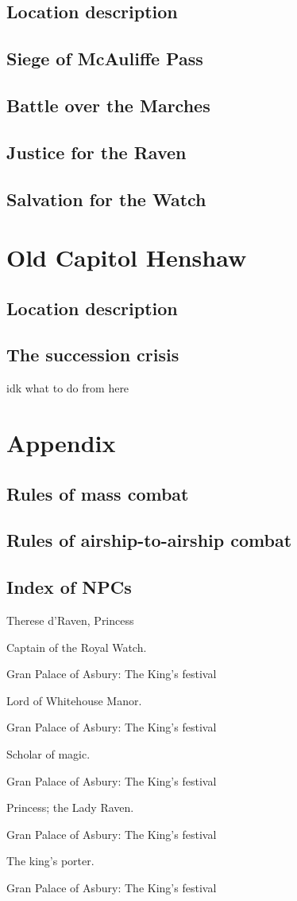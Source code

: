 \documentclass{report}
\theoremstyle{definition}
\begin{document}
\section{Location description}
\section{Siege of McAuliffe Pass}
\section{Battle over the Marches}
\section{Justice for the Raven}
\section{Salvation for the Watch}
\chapter{Old Capitol Henshaw}
\section{Location description}
\section{The succession crisis}
idk what to do from here

\chapter{Appendix}
\section{Rules of mass combat}
\section{Rules of airship-to-airship combat}
\section{Index of NPCs}
\begin{labeling}{Therese d'Raven, Princess}
\item [Ashelia Haberon] Captain of the Royal Watch.

Gran Palace of Asbury: The King's festival
\item [Bertran Rasser] Lord of Whitehouse Manor.

Gran Palace of Asbury: The King's festival
\item [Jan Hue] Scholar of magic.

Gran Palace of Asbury: The King's festival
\item [Therese d'Raven] Princess; the Lady Raven.

Gran Palace of Asbury: The King's festival
\item [Wodehouse] The king's porter.

Gran Palace of Asbury: The King's festival
\end{labeling}
\end{document}
